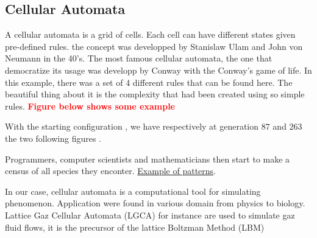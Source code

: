 \documentclass[../main.tex]{subfiles}
\begin{document}
\subsection{Cellular Automata}

A cellular automata is a grid of cells. Each cell can have different states given pre-defined rules. the concept was developped by Stanislaw Ulam and John von Neumann in the 40's.
The most famous cellular automata, the one that democratize its usage was developp by Conway with the Conway's game of life. In this example, there was a set of 4 different rules that can be found here.
The beautiful thing about it is the complexity that had been created using so simple rules. \textcolor{red}{\textbf{Figure below shows some example}}

With the starting configuration \figtonum, we have respectively at generation $87$ and $263$ the two following figures \figtonum.

Programmers, computer scientists and mathematicians then start to make a census of all species they enconter.
\href{https://en.wikipedia.org/wiki/Conway's_Game_of_Life#Examples_of_patterns}{Example of patterns}.

In our case, cellular automata is a computational tool for simulating phenomenon. Application were found in various domain from physics to biology. Lattice Gaz Cellular Automata (LGCA) for instance are used to simulate gaz fluid flows, it is the precursor of the lattice Boltzman Method (LBM)\cite{chen_1998}
\end{document}
